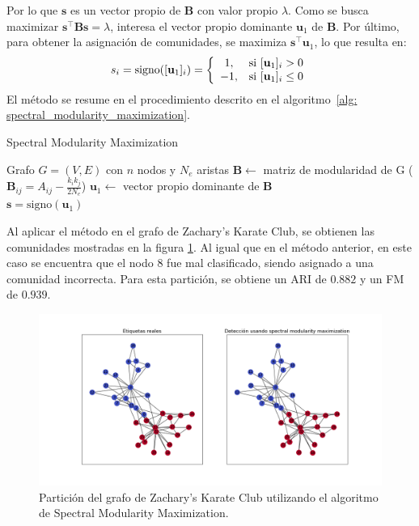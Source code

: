 \documentclass{article}
\begin{document}
Por lo que $\mathbf{s}$ es un vector propio de $\mathbf{B}$ con valor propio $\lambda$. Como se busca maximizar $\mathbf{s}^\top \mathbf{B} \mathbf{s} = \lambda$, interesa el vector propio dominante $\mathbf{u}_1$ de $\mathbf{B}$. Por último, para obtener la asignación de comunidades, se maximiza $\mathbf{s}^\top \mathbf{u}_1$, lo que resulta en:
\begin{equation*}
    s_i = \text{signo}([\mathbf{u}_1]_i) = \left\lbrace
    \begin{array}{c l}
        1,  & \text{si } [\mathbf{u}_1]_i > 0    \\
        -1, & \text{si } [\mathbf{u}_1]_i \leq 0
    \end{array}\right.
\end{equation*}
El método se resume en el procedimiento descrito en el algoritmo~\ref{alg: spectral_modularity_maximization}.
\begin{algorithm}
    \caption{Spectral Modularity Maximization}
    \label{alg: spectral_modularity_maximization}
    \begin{algorithmic}
        \Require Grafo $G = (V, E)$ con $n$ nodos y $N_e$ aristas
        \State $\mathbf{B} \leftarrow $ matriz de modularidad de G ($\mathbf{B}_{ij} = A_{ij} - \frac{k_i k_j}{2N_e}$)
        \State $\mathbf{u}_1 \leftarrow $ vector propio dominante de $\mathbf{B}$ \\
        \Return $\mathbf{s} = \text{signo}(\mathbf{u}_1)$
    \end{algorithmic}
\end{algorithm}



Al aplicar el método en el grafo de Zachary's Karate Club, se obtienen las comunidades mostradas en la figura \ref{fig: spectral_modularity_maximization}. Al igual que en el método anterior, en este caso se encuentra que el nodo 8 fue mal clasificado, siendo asignado a una comunidad incorrecta. Para esta partición, se obtiene un ARI de $0.882$ y un FM de $0.939$.

\begin{figure}[htb]
    \centering
    \includegraphics[width=\textwidth]{imagenes/spectral_modularity_maximization.png}
    \caption{Partición del grafo de Zachary's Karate Club utilizando el algoritmo de Spectral Modularity Maximization.}

    \label{fig: spectral_modularity_maximization}
\end{figure}
\end{document}
